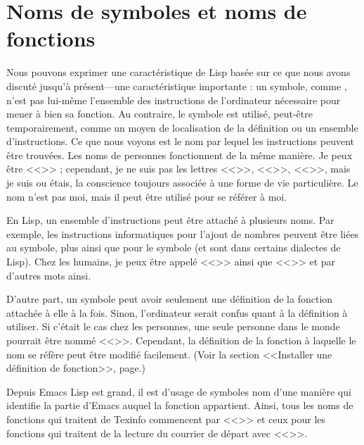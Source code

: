 \section{Noms de symboles et noms de fonctions}

Nous pouvons exprimer une caractéristique de Lisp basée sur ce que
nous avons discuté jusqu'à présent---une caractéristique importante :
un symbole, comme \tm{+}, n'est pas lui-même l'ensemble des
instructions de l'ordinateur nécessaire pour mener à bien sa
fonction. Au contraire, le symbole est utilisé, peut-être
temporairement, comme un moyen de localisation de la définition ou un
ensemble d'instructions. Ce que nous voyons est le nom par lequel les
instructions peuvent être trouvées. Les noms de personnes fonctionnent de
la même manière. Je peux être <<>> ; cependant, je ne suis pas
les lettres <<>>, <<>>, <<>>, mais je suis ou étais,
la conscience toujours associée à une forme de vie particulière. Le
nom n'est pas moi, mais il peut être utilisé pour se référer à moi. 

En Lisp, un ensemble d'instructions peut être attaché à plusieurs
noms. Par exemple, les instructions informatiques pour l'ajout de
nombres peuvent être liées au symbole, plus ainsi que pour le symbole
\tm{+} (et sont dans certains dialectes de Lisp). Chez les humains, je
peux être appelé <<>> ainsi que <<>> et par
d'autres mots ainsi. 

D'autre part, un symbole peut avoir seulement une définition de la
fonction attachée à elle à la fois. Sinon, l'ordinateur serait confus
quant à la définition à utiliser. Si c'était le cas chez les
personnes, une seule personne dans le monde pourrait être nommé
<<>>. Cependant, la définition de la fonction à laquelle le
nom se réfère peut être modifié facilement. (Voir la
section <<Installer une définition de fonction>>,
page.) 

Depuis Emacs Lisp est grand, il est d'usage de symboles nom d'une
manière qui identifie la partie d'Emacs auquel la fonction
appartient. Ainsi, tous les noms de fonctions qui traitent de Texinfo
commencent par <<>> et ceux pour les fonctions qui
traitent de la lecture du courrier de départ avec <<>>.


